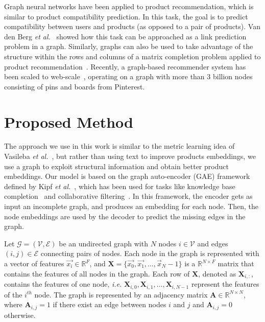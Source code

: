 \documentclass[10pt,twocolumn,letterpaper]{article}
\begin{document}
Graph neural networks have been applied to product recommendation, which is similar to product compatibility prediction. In this task, the goal is to predict compatibility between users and products (as opposed to a pair of products). Van den Berg \emph{et al.}~\cite{vdberg2017graph} showed how this task can be approached as a link prediction problem in a graph. Similarly, graphs can also be used to take advantage of the structure within the rows and columns of a matrix completion problem applied to product recommendation~\cite{kalofolias2014matrix, monti2017geometric_mc}. Recently, a graph-based recommender system has been scaled to web-scale~\cite{ying2018graph}, operating on a graph with more than 3 billion nodes consisting of pins and boards from Pinterest.












\section{Proposed Method}
\label{sec:method}


The approach we use in this work is similar to the metric learning idea of Vasileba \emph{et al.}~\cite{vasileva2018learning}, but rather than using text to improve products embeddings, we use a graph to exploit structural information and obtain better product embeddings. 
Our model is based on the graph auto-encoder (GAE) framework defined by Kipf \emph{et al.}~\cite{kipf2016variational}, which has been used for tasks like knowledge base completion~\cite{schlichtkrull2018modeling} and collaborative filtering~\cite{vdberg2017graph}.
In this framework, the encoder gets as input an incomplete graph, and produces an embedding for each node. Then, the node embeddings are used by the decoder to predict the missing edges in the graph.

Let $\mathcal{G} = (\mathcal{V}, \mathcal{E})$ be an undirected graph with $N$ nodes $i \in \mathcal{V}$ and edges $(i, j) \in \mathcal{E}$ connecting pairs of nodes. Each node in the graph is represented with a vector of features $\vec{x_i} \in \mathbb{R}^F$, and $\boldsymbol{X} = \{\vec{x_0}, \vec{x_1}, \dots, \vec{x}_N-1 \}$ is a $\mathbb{R}^{N \times F}$ matrix that contains the features of all nodes in the graph. Each row of $\boldsymbol{X}$, denoted as $\boldsymbol{X}_{i,:}$, contains the features of one node, \textit{i.e.} $\boldsymbol{X}_{i, 0}, \boldsymbol{X}_{i, 1}, \dots, \boldsymbol{X}_{i, N-1}$ represent the features of the $i^{th}$ node. 
The graph is represented by an adjacency matrix $\boldsymbol{A} \in \mathbb{R}^{N \times N}$,
where $\boldsymbol{A}_{i,j} = 1$ if there exist an edge between nodes $i$ and $j$ and $\boldsymbol{A}_{i,j} = 0$ otherwise.
\end{document}
